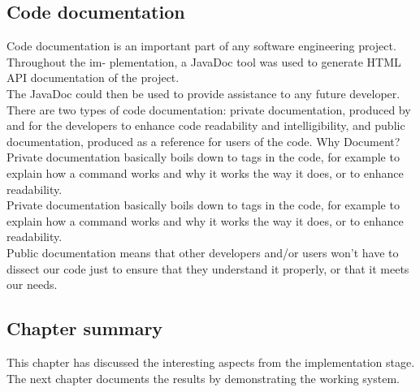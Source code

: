 \documentclass[12pt,a4paper]{article}
\newcommand\tab[1][.7cm]{\hspace*{#1}}
\begin{document}
		\subsection{Code documentation}
	\tab Code documentation is an important part of any software engineering project. Throughout the im-
plementation, a JavaDoc tool was used to generate HTML API documentation of the project.\\The
JavaDoc \cite{Ref:19} could then be used to provide assistance to any future developer.\\There are two types of code documentation: private documentation, produced by and for the developers to enhance code readability and intelligibility, and public documentation, produced as a reference for users of the code. Why Document? Private documentation basically boils down to tags in the code, for example to explain how a command works and why it works the way it does, or to enhance readability.\\Private documentation basically boils down to tags in the code, for example to explain how a command works and why it works the way it does, or to enhance readability.\\Public documentation means that other developers and/or users won’t have to dissect our code just to ensure that they understand it properly, or that it meets our needs.

	\subsection{Chapter summary}
	\tab This chapter has discussed the interesting aspects from the implementation stage. The next chapter
documents the results by demonstrating the working system.
	
	\newpage	
\end{document}
